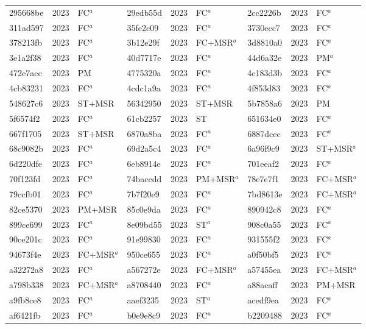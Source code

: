 \begin{longtable}{lll@{\hspace{10pt}}lll@{\hspace{10pt}}lll}
295668be & 2023 & FC$^{a}$ & 29edb55d & 2023 & FC$^{a}$ & 2cc2226b & 2023 & FC$^{a}$ \\
311ad597 & 2023 & FC$^{a}$ & 35fe2c09 & 2023 & FC$^{a}$ & 3730ecc7 & 2023 & FC$^{a}$ \\
378213fb & 2023 & FC$^{a}$ & 3b12e29f & 2023 & FC+MSR$^{a}$ & 3d8810a0 & 2023 & FC$^{a}$ \\
3e1a2f38 & 2023 & FC$^{a}$ & 40d7717e & 2023 & FC$^{a}$ & 44d6a32e & 2023 & PM$^{a}$ \\
472e7acc & 2023 & PM & 4775320a & 2023 & FC$^{a}$ & 4c183d3b & 2023 & FC$^{a}$ \\
4cb83231 & 2023 & FC$^{a}$ & 4cdc1a9a & 2023 & FC$^{a}$ & 4f853d83 & 2023 & FC$^{a}$ \\
548627c6 & 2023 & ST+MSR & 56342950 & 2023 & ST+MSR & 5b7858a6 & 2023 & PM \\
5f6574f2 & 2023 & FC$^{a}$ & 61cb2257 & 2023 & ST & 651634e0 & 2023 & FC$^{a}$ \\
667f1705 & 2023 & ST+MSR & 6870a8ba & 2023 & FC$^{a}$ & 6887dcec & 2023 & FC$^{a}$ \\
68c9082b & 2023 & FC$^{a}$ & 69d2a5c4 & 2023 & FC$^{a}$ & 6a96f9c9 & 2023 & ST+MSR$^{a}$ \\
6d220dfe & 2023 & FC$^{a}$ & 6eb8914e & 2023 & FC$^{a}$ & 701eeaf2 & 2023 & FC$^{a}$ \\
70f123fd & 2023 & FC$^{a}$ & 74baccdd & 2023 & PM+MSR$^{a}$ & 78e7e7f1 & 2023 & FC+MSR$^{a}$ \\
79ccfb01 & 2023 & FC$^{a}$ & 7b7f20e9 & 2023 & FC$^{a}$ & 7bd8613e & 2023 & FC+MSR$^{a}$ \\
82ce5370 & 2023 & PM+MSR & 85c0e9da & 2023 & FC$^{a}$ & 890942c8 & 2023 & FC$^{a}$ \\
899ce699 & 2023 & FC$^{a}$ & 8e09bd55 & 2023 & ST$^{a}$ & 908c0a55 & 2023 & FC$^{a}$ \\
90ce201c & 2023 & FC$^{a}$ & 91e99830 & 2023 & FC$^{a}$ & 931555f2 & 2023 & FC$^{a}$ \\
94673f4e & 2023 & FC+MSR$^{a}$ & 950ce655 & 2023 & FC$^{a}$ & a0f50bf5 & 2023 & FC$^{a}$ \\
a32272a8 & 2023 & FC$^{a}$ & a567272e & 2023 & FC+MSR$^{a}$ & a57455ea & 2023 & FC+MSR$^{a}$ \\
a798b338 & 2023 & FC+MSR$^{a}$ & a8708440 & 2023 & FC$^{a}$ & a88acaff & 2023 & PM+MSR \\
a9fb8ce8 & 2023 & FC$^{a}$ & aaef3235 & 2023 & ST$^{a}$ & acedf9ea & 2023 & FC$^{a}$ \\
af6421fb & 2023 & FC$^{a}$ & b0e9e8c9 & 2023 & FC$^{a}$ & b2209488 & 2023 & FC$^{a}$ \\

\end{longtable}
